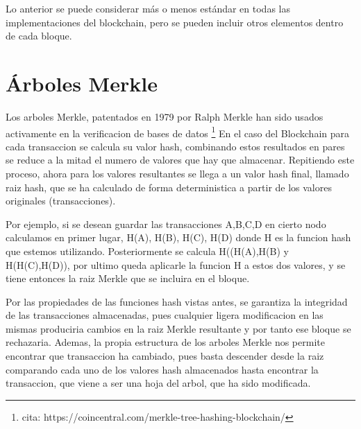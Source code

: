 Lo anterior se puede considerar más o menos estándar en todas las implementaciones del blockchain, pero se pueden incluir otros elementos dentro de cada bloque.
\begin{figure}[H]
  \qquad

	\label{fig:blockchain}%
\end{figure}

\section{Árboles Merkle}\label{merkle}
Los arboles Merkle, patentados en 1979 por Ralph Merkle han sido usados activamente en la verificacion de bases de datos \footnote{cita: https://coincentral.com/merkle-tree-hashing-blockchain/}
En el caso del Blockchain para cada transaccion se calcula su valor hash, combinando estos resultados en pares se reduce a la mitad el numero de valores que hay que almacenar. Repitiendo este proceso, ahora para los valores resultantes se llega a un valor hash final, llamado raiz hash, que se ha calculado de forma deterministica a partir de los valores originales (transacciones).

Por ejemplo, si se desean guardar las transacciones A,B,C,D en cierto nodo calculamos en primer lugar, H(A), H(B), H(C), H(D) donde H es la funcion hash que estemos utilizando. Posteriormente se calcula H((H(A),H(B) y H(H(C),H(D)), por ultimo queda aplicarle la funcion H a estos dos valores, y se tiene entonces la raiz Merkle que se incluira en el bloque.

Por las propiedades de las funciones hash vistas antes, se garantiza la integridad de las transacciones almacenadas, pues cualquier ligera modificacion en las mismas produciria cambios en la raiz Merkle resultante y por tanto ese bloque se rechazaria. Ademas, la propia estructura de los arboles Merkle nos permite encontrar que transaccion ha cambiado, pues basta descender desde la raiz comparando cada uno de los valores hash almacenados hasta encontrar la transaccion, que viene a ser una hoja del arbol, que ha sido modificada.

